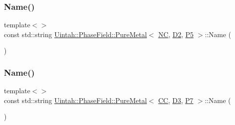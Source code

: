 \subsubsection{\texorpdfstring{Name()}{Name()}\hspace{0.1cm}{\footnotesize\ttfamily [2/8]}}
{\footnotesize\ttfamily template$<$$>$ \\
const std\+::string \hyperlink{classUintah_1_1PhaseField_1_1PureMetal}{Uintah\+::\+Phase\+Field\+::\+Pure\+Metal}$<$ \hyperlink{namespaceUintah_1_1PhaseField_a33d355affda78a83f45755ba8388cedda77924170fe82bfd58b74ca3e44139718}{NC}, \hyperlink{namespaceUintah_1_1PhaseField_a12bfc68444894dffdf0cb8d9cf0cc76aa1a451dae278b0103a94105c8776e9a67}{D2}, \hyperlink{namespaceUintah_1_1PhaseField_a24d833a720598df1020f5cc2e75f8702a218e7fca21085b602c79158a04bc83a0}{P5} $>$\+::Name (\begin{DoxyParamCaption}{ }\end{DoxyParamCaption})}

\mbox{\label{classUintah_1_1PhaseField_1_1PureMetal_ab01bb77d0857a9ddf43938a5a2b05792}} 
\subsubsection{\texorpdfstring{Name()}{Name()}\hspace{0.1cm}{\footnotesize\ttfamily [3/8]}}
{\footnotesize\ttfamily template$<$$>$ \\
const std\+::string \hyperlink{classUintah_1_1PhaseField_1_1PureMetal}{Uintah\+::\+Phase\+Field\+::\+Pure\+Metal}$<$ \hyperlink{namespaceUintah_1_1PhaseField_a33d355affda78a83f45755ba8388cedda22303704507d024d1d6508ed9859a85a}{CC}, \hyperlink{namespaceUintah_1_1PhaseField_a12bfc68444894dffdf0cb8d9cf0cc76aa72fd61934c7ca788c49ad90629f76e78}{D3}, \hyperlink{namespaceUintah_1_1PhaseField_a24d833a720598df1020f5cc2e75f8702a099a5b9a00f5644bb917fdec6afd8768}{P7} $>$\+::Name (\begin{DoxyParamCaption}{ }\end{DoxyParamCaption})}

\mbox{\label{classUintah_1_1PhaseField_1_1PureMetal_a1e322e8581543b0ffb02af48bace6731}} 
